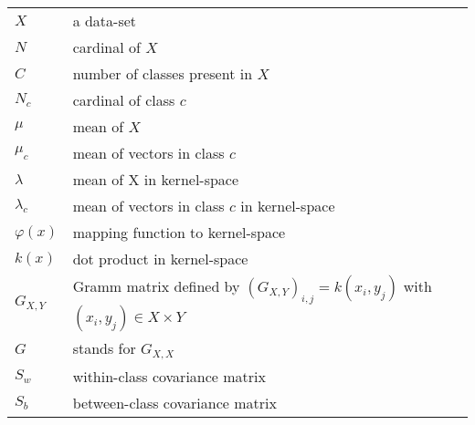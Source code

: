 
\begin{tabular}{ll}
$X$ & a data-set \\
$N$ & cardinal of $X$ \\
$C$ & number of classes present in $X$ \\
$N_c$ & cardinal of class $c$ \\
$\mu$ & mean of $X$ \\
$\mu_c$ & mean of vectors in class $c$ \\
$\lambda$ & mean of X in kernel-space \\
$\lambda_c$ & mean of vectors in class $c$ in kernel-space \\
$\varphi(x)$ & mapping function to kernel-space \\
$k(x)$ & dot product in kernel-space \\
$G_{X,Y}$ & Gramm matrix defined by ${(G_{X,Y})}_{i,j} = k(x_i, y_j)$ with $(x_i, y_j) \in X \times Y$\\
$G$ & stands for ${G_{X,X}}$\\
$S_w$ & within-class covariance matrix \\
$S_b$ & between-class covariance matrix
\end{tabular}
